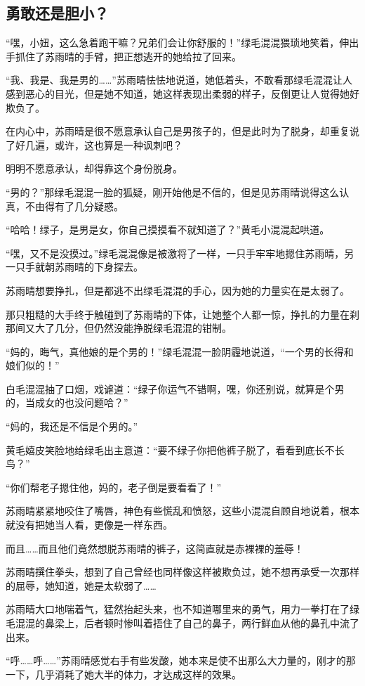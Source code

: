 \subsection{勇敢还是胆小？}

“嘿，小妞，这么急着跑干嘛？兄弟们会让你舒服的！”绿毛混混猥琐地笑着，伸出手抓住了苏雨晴的手臂，把正想逃开的她给拉了回来。

“我、我是、我是男的……”苏雨晴怯怯地说道，她低着头，不敢看那绿毛混混让人感到恶心的目光，但是她不知道，她这样表现出柔弱的样子，反倒更让人觉得她好欺负了。

在内心中，苏雨晴是很不愿意承认自己是男孩子的，但是此时为了脱身，却重复说了好几遍，或许，这也算是一种讽刺吧？

明明不愿意承认，却得靠这个身份脱身。

“男的？”那绿毛混混一脸的狐疑，刚开始他是不信的，但是见苏雨晴说得这么认真，不由得有了几分疑惑。

“哈哈！绿子，是男是女，你自己摸摸看不就知道了？”黄毛小混混起哄道。

“嘿，又不是没摸过。”绿毛混混像是被激将了一样，一只手牢牢地摁住苏雨晴，另一只手就朝苏雨晴的下身探去。

苏雨晴想要挣扎，但是都逃不出绿毛混混的手心，因为她的力量实在是太弱了。

那只粗糙的大手终于触碰到了苏雨晴的下体，让她整个人都一惊，挣扎的力量在刹那间又大了几分，但仍然没能挣脱绿毛混混的钳制。

“妈的，晦气，真他娘的是个男的！”绿毛混混一脸阴霾地说道，“一个男的长得和娘们似的！”

白毛混混抽了口烟，戏谑道：“绿子你运气不错啊，嘿，你还别说，就算是个男的，当成女的也没问题哈？”

“妈的，我还是不信是个男的。”

黄毛嬉皮笑脸地给绿毛出主意道：“要不绿子你把他裤子脱了，看看到底长不长鸟？”

“你们帮老子摁住他，妈的，老子倒是要看看了！”

苏雨晴紧紧地咬住了嘴唇，神色有些慌乱和愤怒，这些小混混自顾自地说着，根本就没有把她当人看，更像是一样东西。

而且……而且他们竟然想脱苏雨晴的裤子，这简直就是赤裸裸的羞辱！

苏雨晴撰住拳头，想到了自己曾经也同样像这样被欺负过，她不想再承受一次那样的屈辱，她知道，她是太软弱了……

苏雨晴大口地喘着气，猛然抬起头来，也不知道哪里来的勇气，用力一拳打在了绿毛混混的鼻梁上，后者顿时惨叫着捂住了自己的鼻子，两行鲜血从他的鼻孔中流了出来。

“呼……呼……”苏雨晴感觉右手有些发酸，她本来是使不出那么大力量的，刚才的那一下，几乎消耗了她大半的体力，才达成这样的效果。

